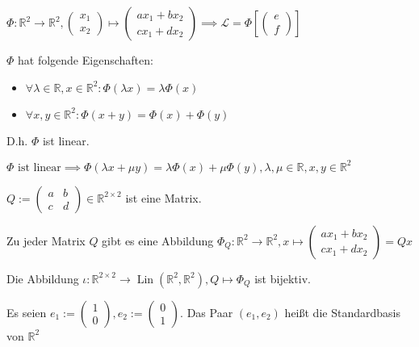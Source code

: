 \begin{proposition}
  $\Phi: \mathbb{R}^2 \to \mathbb{R}^2,
  \begin{pmatrix}
    x_1\\x_2
  \end{pmatrix}
  \mapsto
  \begin{pmatrix}
    ax_1 + bx_2\\ cx_1+dx_2
  \end{pmatrix}
  \implies \mathscr{L} = \Phi \left[
    \begin{pmatrix}
      e\\f
    \end{pmatrix}
  \right]
  $

  $\Phi$ hat folgende Eigenschaften:
  \begin{itemize}
  \item $\forall \lambda \in \mathbb{R}, x \in \mathbb{R}^2: \Phi(\lambda x) = \lambda \Phi(x)$
  \item $\forall x, y \in \mathbb{R}^2: \Phi(x + y) = \Phi(x) + \Phi(y)$
  \end{itemize}

  D.h. $\Phi$ ist linear.
\end{proposition}
\begin{remark}
  $\Phi \text{ ist linear} \implies \Phi(\lambda x + \mu y) = \lambda \Phi(x) + \mu \Phi (y), \lambda, \mu \in \mathbb{R}, x, y \in \mathbb{R}^2$
\end{remark}
\begin{notation}
  $Q:=
  \begin{pmatrix}
    a&b\\c&d
  \end{pmatrix}
  \in \mathbb{R}^{2 \times 2}$ ist eine Matrix.

  Zu jeder Matrix $Q$ gibt es eine Abbildung $\Phi_Q: \mathbb{R}^2 \to \mathbb{R}^2,
  x \mapsto
  \begin{pmatrix}
    ax_1 + bx_2 \\ cx_1+ dx_2
  \end{pmatrix}
  = Qx
  $
\end{notation}
\begin{theorem}
  Die Abbildung $\iota: \mathbb{R}^{2 \times 2} \to \operatorname{Lin}(\mathbb{R}^2, \mathbb{R}^2), Q \mapsto \Phi_Q$ ist bijektiv.
\end{theorem}
\begin{definition}[Standardbasis]
  Es seien $e_1 :=
  \begin{pmatrix}
    1\\0
  \end{pmatrix}
  , e_2 :=
  \begin{pmatrix}
    0\\1
  \end{pmatrix}
  $. Das Paar $(e_1, e_2)$ heißt die Standardbasis von $\mathbb{R}^2$
\end{definition}

